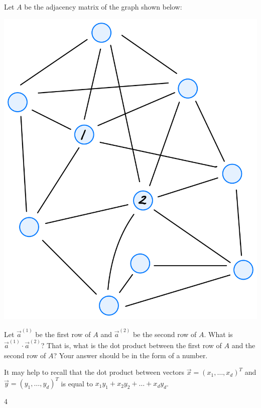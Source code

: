 \begin{prob}
    Let $A$ be the adjacency matrix of the graph shown below:

    \includegraphics[width=.4\textwidth]{./graph.png}

    Let
    $\vec{a}^{(1)}$ be the first row of $A$ and
    $\vec{a}^{(2)}$ be the second row of $A$.
    What is $\vec{a}^{(1)} \cdot \vec{a}^{(2)}$?
    That is, what is the dot product between the first row of $A$ and the second row
    of $A$? Your answer should be in the form of a number.

    It may help to recall that the dot product between vectors $\vec x = (x_1,
    \ldots, x_d)^T$ and $\vec y = (y_1, \ldots, y_d)^T$ is equal to
    $x_1 y_1 + x_2 y_2 + \ldots + x_d y_d$.

    \begin{soln}
        4
    \end{soln}

\end{prob}
